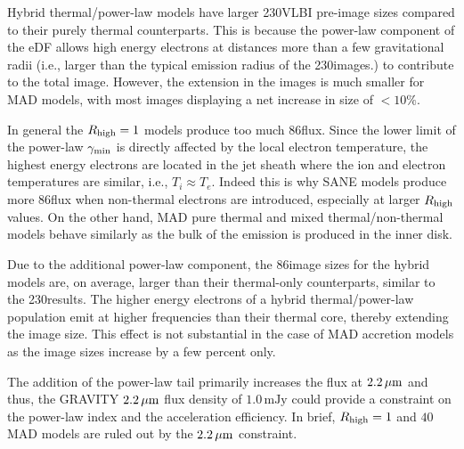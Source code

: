 
Hybrid thermal/power-law models have larger 230\GHz VLBI pre-image sizes compared to their purely thermal counterparts. This is because the power-law component of the eDF allows high energy electrons at distances more than a few gravitational radii (i.e., larger than the typical emission radius of the 230\GHz images.) to contribute to the total image. However, the extension in the images is much smaller for MAD models, with most images displaying a net increase in size of $<10\%$.


In general the $R_{\rm high}=1$ models produce too much 86\GHz flux. Since the lower limit of the power-law $\gamma_{\rm min}$ is directly affected by the local electron temperature, the highest energy electrons are located in the jet sheath where the ion and electron temperatures are similar, i.e., $T_i\approx T_e$. Indeed this is why SANE models produce more 86\GHz flux when non-thermal electrons are introduced, especially at larger $R_{\rm high}$ values. On the other hand, MAD pure thermal and mixed thermal/non-thermal models behave similarly as the bulk of the emission is produced in the inner disk.

Due to the additional power-law component, the 86\GHz image sizes for the hybrid \hamr models are, on average, larger than their thermal-only counterparts, similar to the 230\GHz results. The higher energy electrons of a hybrid thermal/power-law population emit at higher frequencies than their thermal core, thereby extending the image size. This effect is not substantial in the case of MAD accretion models as the image sizes increase by a few percent only.


The addition of the power-law tail primarily increases the flux at $2.2\,\mu\mathrm{m}$ and thus, the GRAVITY $2.2\,\mu\mathrm{m}$ flux density of $1.0\,\mathrm{mJy}$ could provide a constraint on the power-law index and the acceleration efficiency. In brief, $R_\mathrm{high}=1$ and $40$ MAD models are ruled out by the $2.2\,\mu\mathrm{m}$ constraint.


